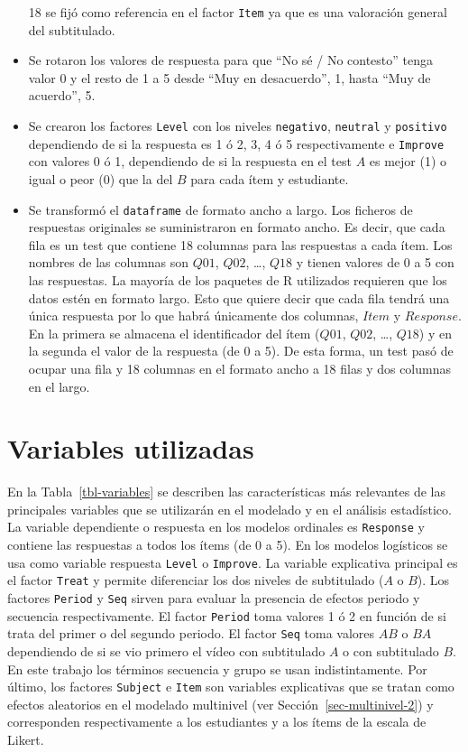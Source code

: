 \documentclass[
  12pt,
  a4paper,
  extrafontsizes,
  onecolumn,
  openright,
  table]{memoir}
\begin{document}
\begin{itemize}
  18 se fijó como referencia en el factor \texttt{Item} ya que es una
  valoración general del subtitulado.
\item
  Se rotaron los valores de respuesta para que \enquote{No sé / No
  contesto} tenga valor 0 y el resto de 1 a 5 desde \enquote{Muy en
  desacuerdo}, 1, hasta \enquote{Muy de acuerdo}, 5.
\item
  Se crearon los factores \texttt{Level} con los niveles
  \texttt{negativo}, \texttt{neutral} y \texttt{positivo} dependiendo de
  si la respuesta es 1 ó 2, 3, 4 ó 5 respectivamente e \texttt{Improve}
  con valores 0 ó 1, dependiendo de si la respuesta en el test \(A\) es
  mejor (1) o igual o peor (0) que la del \(B\) para cada ítem y
  estudiante.
\item
  Se transformó el \texttt{dataframe} de formato ancho a largo. Los
  ficheros de respuestas originales se suministraron en formato ancho.
  Es decir, que cada fila es un test que contiene 18 columnas para las
  respuestas a cada ítem. Los nombres de las columnas son \(Q01\),
  \(Q02\), \ldots, \(Q18\) y tienen valores de 0 a 5 con las respuestas.
  La mayoría de los paquetes de R utilizados requieren que los datos
  estén en formato largo. Esto que quiere decir que cada fila tendrá una
  única respuesta por lo que habrá únicamente dos columnas, \(Item\) y
  \(Response\). En la primera se almacena el identificador del ítem
  (\(Q01\), \(Q02\), \ldots, \(Q18\)) y en la segunda el valor de la
  respuesta (de 0 a 5). De esta forma, un test pasó de ocupar una fila y
  18 columnas en el formato ancho a 18 filas y dos columnas en el largo.
\end{itemize}

\hypertarget{variables-utilizadas}{%
\section{Variables utilizadas}\label{variables-utilizadas}}

En la Tabla~\ref{tbl-variables} se describen las características más
relevantes de las principales variables que se utilizarán en el modelado
y en el análisis estadístico. La variable dependiente o respuesta en los
modelos ordinales es \texttt{Response} y contiene las respuestas a todos
los ítems (de 0 a 5). En los modelos logísticos se usa como variable
respuesta \texttt{Level} o \texttt{Improve}. La variable explicativa
principal es el factor \texttt{Treat} y permite diferenciar los dos
niveles de subtitulado (\(A\) o \(B\)). Los factores \texttt{Period} y
\texttt{Seq} sirven para evaluar la presencia de efectos periodo y
secuencia respectivamente. El factor \texttt{Period} toma valores 1 ó 2
en función de si trata del primer o del segundo periodo. El factor
\texttt{Seq} toma valores \(AB\) o \(BA\) dependiendo de si se vio
primero el vídeo con subtitulado \(A\) o con subtitulado \(B\). En este
trabajo los términos secuencia y grupo se usan indistintamente. Por
último, los factores \texttt{Subject} e \texttt{Item} son variables
explicativas que se tratan como efectos aleatorios en el modelado
multinivel (ver Sección~\ref{sec-multinivel-2}) y corresponden
respectivamente a los estudiantes y a los ítems de la escala de Likert.
\end{document}
